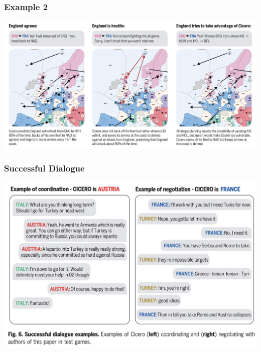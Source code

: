 \documentclass[xcolor=dvipsnames]{beamer}
\newcommand{\0}{\vec{0}}
\begin{document}
\begin{frame}
	\frametitle{Example 2}
	\begin{center}
		\includegraphics[width=\textwidth]{Bakhtin4}
	\end{center}
\end{frame}
\begin{frame}
	\frametitle{Successful Dialogue}
	\begin{center}
		\includegraphics[scale=0.4]{Bakhtin2}
	\end{center}
\end{frame}



	
\end{document}
